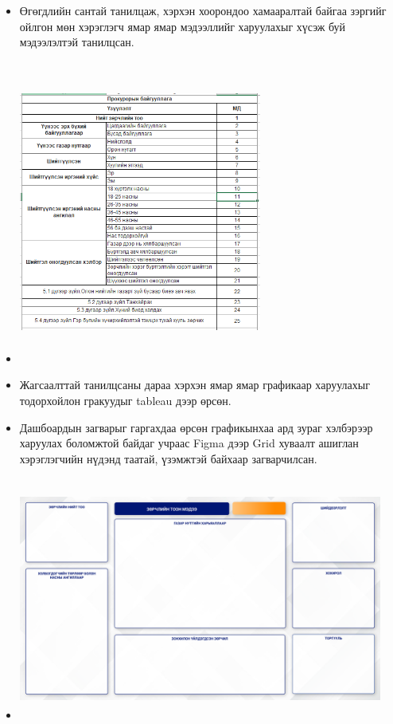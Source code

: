 \begin{itemize}
	\item Өгөгдлийн сантай танилцаж, хэрхэн хоорондоо хамааралтай байгаа зэргийг ойлгон мөн хэрэглэгч ямар ямар мэдээллийг харуулахыг хүсэж буй мэдээлэлтэй танилцсан. 
	\item \begin{minipage}[t]{\linewidth}
			  \centering
			  \includegraphics[width=8cm,height=10cm]{images/harahzuils.PNG}
		  \end{minipage}
	\item Жагсаалттай танилцсаны дараа хэрхэн ямар ямар графикаар харуулахыг тодорхойлон гракуудыг tableau дээр өрсөн.
	\item Дашбоардын загварыг гаргахдаа өрсөн графикынхаа ард зураг хэлбэрээр харуулах боломжтой байдаг учраас Figma дээр Grid хуваалт ашиглан хэрэглэгчийн нүдэнд таатай, үзэмжтэй байхаар загварчилсан.
	\item \begin{minipage}[t]{\linewidth}
				\centering
				\includegraphics[width=12cm,height=8cm]{images/Frame 10.png}

\end{minipage}
\end{itemize}
